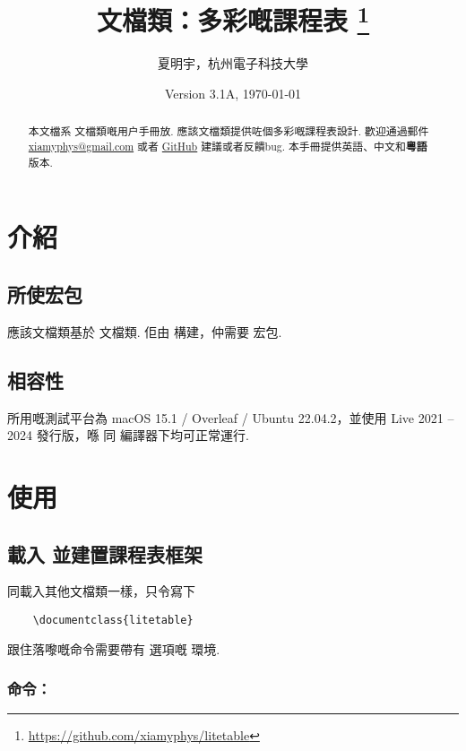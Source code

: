 \documentclass[letterpaper]{l3doc}
\title{
    \cls{litetable} 文檔類：多彩嘅課程表
    \thanks{\url{https://github.com/xiamyphys/litetable}}
}
\author{夏明宇，杭州電子科技大學}
\affil{\href{mailto:xiamyphys@gmail.com}{xiamyphys@gmail.com}}
\date{Version 3.1A, \today}
\begin{document}
\maketitle

\begin{abstract}
    本文檔系  文檔類嘅用户手冊放. 應該文檔類提供咗個多彩嘅課程表設計. 歡迎通過郵件 \href{mailto:xiamyphys@gmail.com}{xiamyphys@gmail.com} 或者 \href{https://github.com/xiamyphys/litetable/issues}{GitHub} 建議或者反饋bug. 本手冊提供英語、中文和\textbf{粵語}版本.
\end{abstract}

\section{介紹}

\subsection{所使宏包}

應該文檔類基於  文檔類. 佢由  構建，仲需要  宏包. 

\subsection{相容性}

所用嘅測試平台為 macOS 15.1 / Overleaf / Ubuntu 22.04.2，並使用 Live 2021 -- 2024 發行版，喺  同  編譯器下均可正常運行.

\section{使用}

\subsection{載入  並建置課程表框架}

同載入其他文檔類一樣，只令寫下

\begin{Verbatim}
    \documentclass{litetable}
\end{Verbatim}

跟住落嚟嘅命令需要帶有  選項嘅  環境.

\subsubsection{命令：}
\end{document}
